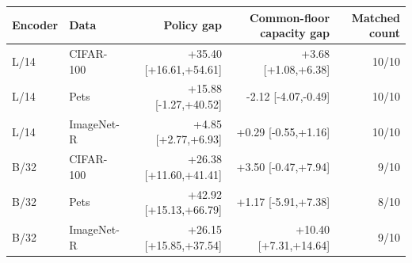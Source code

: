 \begin{tabular}{@{}llrrr@{}}
\toprule
Encoder & Data & Policy gap & Common-floor capacity gap & Matched count \\
\midrule
L/14 & CIFAR-100 & +35.40 [+16.61,+54.61] & +3.68 [+1.08,+6.38] & 10/10 \\
L/14 & Pets & +15.88 [-1.27,+40.52] & -2.12 [-4.07,-0.49] & 10/10 \\
L/14 & ImageNet-R & +4.85 [+2.77,+6.93] & +0.29 [-0.55,+1.16] & 10/10 \\
B/32 & CIFAR-100 & +26.38 [+11.60,+41.41] & +3.50 [-0.47,+7.94] & 9/10 \\
B/32 & Pets & +42.92 [+15.13,+66.79] & +1.17 [-5.91,+7.38] & 8/10 \\
B/32 & ImageNet-R & +26.15 [+15.85,+37.54] & +10.40 [+7.31,+14.64] & 9/10 \\
\bottomrule
\end{tabular}
